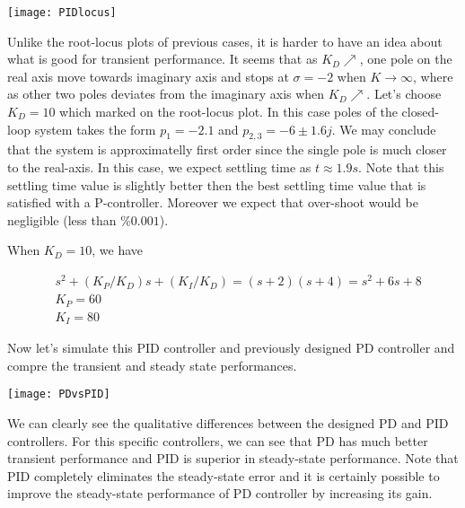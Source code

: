 \documentclass[twoside]{article}
\begin{document}
\vspace{12 pt}

  \begin{minipage}[h]{1\linewidth}
    \begin{center}
      \texttt{[image: PIDlocus]}
    \end{center}
  \end{minipage}

\vspace{12 pt}

Unlike the root-locus plots of previous cases, it is harder to
have an idea about what is good for transient performance.
It seems that as $K_D \nearrow$, one pole on the real axis 
move towards imaginary axis and stops at $\sigma = -2$ when
$K \to \infty$, where as other two poles deviates from the imaginary
axis when $K_D \nearrow$. Let's choose $K_D = 10$ which marked 
on the root-locus plot. In this case poles of the closed-loop system 
takes the form $p_1 = -2.1$ and $p_{2,3} = -6 \pm 1.6 j$. We 
may conclude that the system is approximatelly first order since
the single pole is much closer to the real-axis. In this case, we
expect settling time as $t \approx 1.9 s$. Note that this settling time
value is slightly better then the best settling time value that is
satisfied with a P-controller. Moreover we expect that over-shoot would
be negligible (less than $\% 0.001$).

When $K_D = 10$, we have 

\begin{align*}
&s^2 +   (K_P/K_D) s  + (K_I/K_D) = (s+2)(s+4) = s^2 + 6 s + 8
\\
&K_P = 60
\\
&K_I = 80
\end{align*}

Now let's simulate this PID controller and previously designed PD
controller and compre the transient and steady state performances.

\vspace{12 pt}

  \begin{minipage}[h]{1\linewidth}
    \begin{center}
      \texttt{[image: PDvsPID]}
    \end{center}
  \end{minipage}

\vspace{12 pt}

We can clearly see the qualitative differences between the designed PD
and PID controllers. For this specific controllers, we can see that 
PD has much better transient performance and PID is superior in
steady-state performance. Note that PID completely eliminates the
steady-state error and it is certainly possible to improve the
steady-state performance of PD controller by increasing its gain.
\end{document}

